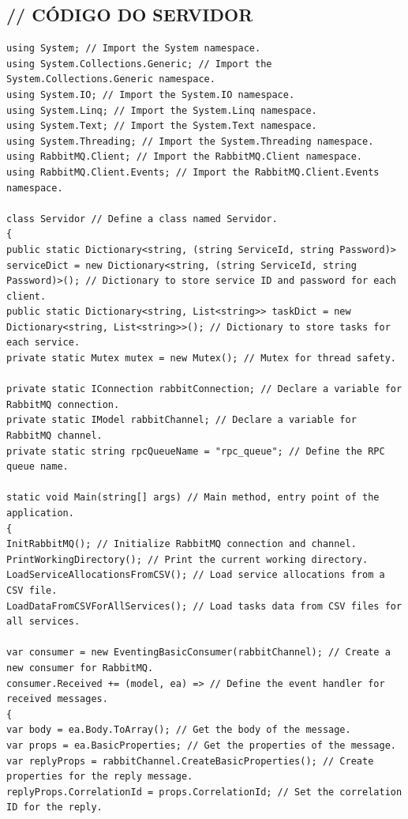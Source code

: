 \documentclass[12pt]{article}
\begin{document}
\subsection{// CÓDIGO DO SERVIDOR}
\tiny{
\begin{verbatim}
using System; // Import the System namespace.
using System.Collections.Generic; // Import the System.Collections.Generic namespace.
using System.IO; // Import the System.IO namespace.
using System.Linq; // Import the System.Linq namespace.
using System.Text; // Import the System.Text namespace.
using System.Threading; // Import the System.Threading namespace.
using RabbitMQ.Client; // Import the RabbitMQ.Client namespace.
using RabbitMQ.Client.Events; // Import the RabbitMQ.Client.Events namespace.

class Servidor // Define a class named Servidor.
{
public static Dictionary<string, (string ServiceId, string Password)> serviceDict = new Dictionary<string, (string ServiceId, string Password)>(); // Dictionary to store service ID and password for each client.
public static Dictionary<string, List<string>> taskDict = new Dictionary<string, List<string>>(); // Dictionary to store tasks for each service.
private static Mutex mutex = new Mutex(); // Mutex for thread safety.

private static IConnection rabbitConnection; // Declare a variable for RabbitMQ connection.
private static IModel rabbitChannel; // Declare a variable for RabbitMQ channel.
private static string rpcQueueName = "rpc_queue"; // Define the RPC queue name.

static void Main(string[] args) // Main method, entry point of the application.
{
InitRabbitMQ(); // Initialize RabbitMQ connection and channel.
PrintWorkingDirectory(); // Print the current working directory.
LoadServiceAllocationsFromCSV(); // Load service allocations from a CSV file.
LoadDataFromCSVForAllServices(); // Load tasks data from CSV files for all services.

var consumer = new EventingBasicConsumer(rabbitChannel); // Create a new consumer for RabbitMQ.
consumer.Received += (model, ea) => // Define the event handler for received messages.
{
var body = ea.Body.ToArray(); // Get the body of the message.
var props = ea.BasicProperties; // Get the properties of the message.
var replyProps = rabbitChannel.CreateBasicProperties(); // Create properties for the reply message.
replyProps.CorrelationId = props.CorrelationId; // Set the correlation ID for the reply.


\end{verbatim}}
\end{document}

